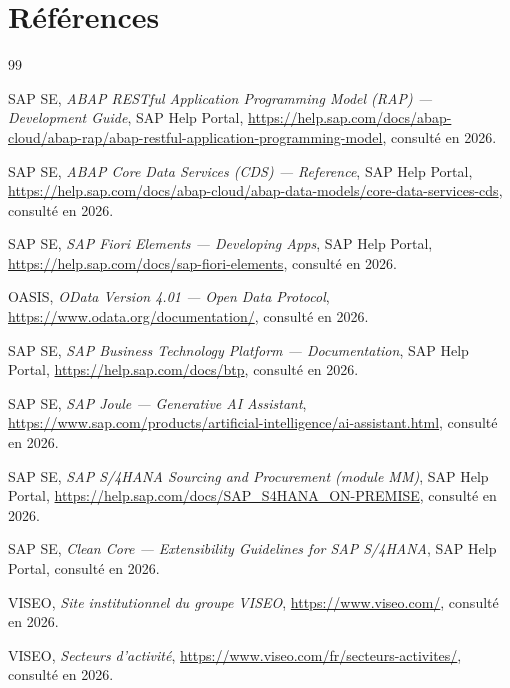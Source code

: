 \documentclass[12pt,a4paper,oneside]{report}
\begin{document}
\chapter*{R\'ef\'erences}
{}
\label{ch:references}
\begin{thebibliography}{99}

 SAP SE, \textit{ABAP RESTful Application Programming Model (RAP) --- Development Guide}, SAP Help Portal, \url{https://help.sap.com/docs/abap-cloud/abap-rap/abap-restful-application-programming-model}, consult\'e en 2026.

 SAP SE, \textit{ABAP Core Data Services (CDS) --- Reference}, SAP Help Portal, \url{https://help.sap.com/docs/abap-cloud/abap-data-models/core-data-services-cds}, consult\'e en 2026.

 SAP SE, \textit{SAP Fiori Elements --- Developing Apps}, SAP Help Portal, \url{https://help.sap.com/docs/sap-fiori-elements}, consult\'e en 2026.

 OASIS, \textit{OData Version 4.01 --- Open Data Protocol}, \url{https://www.odata.org/documentation/}, consult\'e en 2026.

 SAP SE, \textit{SAP Business Technology Platform --- Documentation}, SAP Help Portal, \url{https://help.sap.com/docs/btp}, consult\'e en 2026.

 SAP SE, \textit{SAP Joule --- Generative AI Assistant}, \url{https://www.sap.com/products/artificial-intelligence/ai-assistant.html}, consult\'e en 2026.

 SAP SE, \textit{SAP S/4HANA Sourcing and Procurement (module MM)}, SAP Help Portal, \url{https://help.sap.com/docs/SAP_S4HANA_ON-PREMISE}, consult\'e en 2026.

 SAP SE, \textit{Clean Core --- Extensibility Guidelines for SAP S/4HANA}, SAP Help Portal, consult\'e en 2026.

 VISEO, \textit{Site institutionnel du groupe VISEO}, \url{https://www.viseo.com/}, consult\'e en 2026.

 VISEO, \textit{Secteurs d'activit\'e}, \url{https://www.viseo.com/fr/secteurs-activites/}, consult\'e en 2026.

\end{thebibliography}
\end{document}
